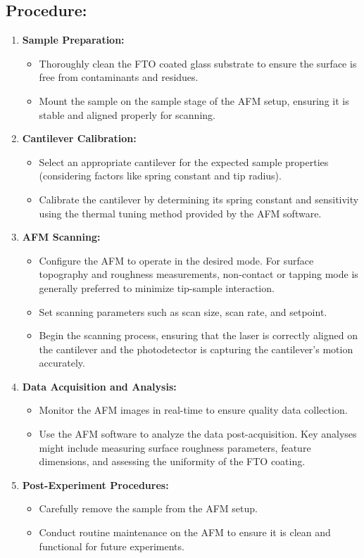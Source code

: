 \documentclass[11pt]{article}
\begin{document}
		\subsection*{Procedure:}
		\begin{enumerate}
			\item \textbf{Sample Preparation:}
			\begin{itemize}
				\item Thoroughly clean the FTO coated glass substrate to ensure the surface is free from contaminants and residues.
				\item Mount the sample on the sample stage of the AFM setup, ensuring it is stable and aligned properly for scanning.
			\end{itemize}
			
			\item \textbf{Cantilever Calibration:}
			\begin{itemize}
				\item Select an appropriate cantilever for the expected sample properties (considering factors like spring constant and tip radius).
				\item Calibrate the cantilever by determining its spring constant and sensitivity using the thermal tuning method provided by the AFM software.
			\end{itemize}
			
			\item \textbf{AFM Scanning:}
			\begin{itemize}
				\item Configure the AFM to operate in the desired mode. For surface topography and roughness measurements, non-contact or tapping mode is generally preferred to minimize tip-sample interaction.
				\item Set scanning parameters such as scan size, scan rate, and setpoint.
				\item Begin the scanning process, ensuring that the laser is correctly aligned on the cantilever and the photodetector is capturing the cantilever’s motion accurately.
			\end{itemize}
			
			\item \textbf{Data Acquisition and Analysis:}
			\begin{itemize}
				\item Monitor the AFM images in real-time to ensure quality data collection.
				\item Use the AFM software to analyze the data post-acquisition. Key analyses might include measuring surface roughness parameters, feature dimensions, and assessing the uniformity of the FTO coating.
			\end{itemize}
			
			\item \textbf{Post-Experiment Procedures:}
			\begin{itemize}
				\item Carefully remove the sample from the AFM setup.
				\item Conduct routine maintenance on the AFM to ensure it is clean and functional for future experiments.
			\end{itemize}
		\end{enumerate}
	
\end{document}
